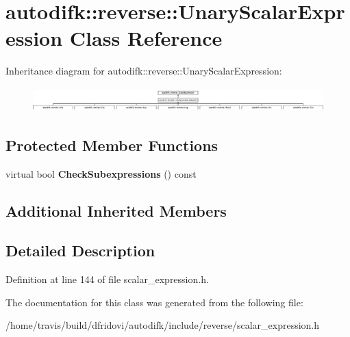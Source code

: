 \hypertarget{classautodifk_1_1reverse_1_1_unary_scalar_expression}{\section{autodifk\-:\-:reverse\-:\-:Unary\-Scalar\-Expression Class Reference}
\label{classautodifk_1_1reverse_1_1_unary_scalar_expression}
}
Inheritance diagram for autodifk\-:\-:reverse\-:\-:Unary\-Scalar\-Expression\-:\begin{figure}[H]
\begin{center}
\leavevmode
\includegraphics[height=0.948617cm]{classautodifk_1_1reverse_1_1_unary_scalar_expression}
\end{center}
\end{figure}
\subsection*{Protected Member Functions}
\begin{DoxyCompactItemize}
\item 
\hypertarget{classautodifk_1_1reverse_1_1_unary_scalar_expression_a6333034cd7c8e1aa887746161908c390}{virtual bool {\bfseries Check\-Subexpressions} () const }\label{classautodifk_1_1reverse_1_1_unary_scalar_expression_a6333034cd7c8e1aa887746161908c390}

\end{DoxyCompactItemize}
\subsection*{Additional Inherited Members}


\subsection{Detailed Description}


Definition at line 144 of file scalar\-\_\-expression.\-h.



The documentation for this class was generated from the following file\-:\begin{DoxyCompactItemize}
\item 
/home/travis/build/dfridovi/autodifk/include/reverse/scalar\-\_\-expression.\-h\end{DoxyCompactItemize}
